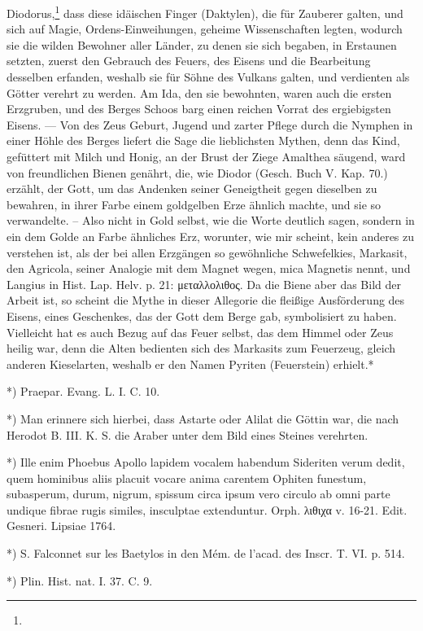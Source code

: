 \documentclass[a4paper, 11pt, oneside, polutonikogreek, german]{article}
\begin{document}
Diodorus,\footnote{} dass diese idäischen Finger (Daktylen), die für Zauberer galten, und sich auf Magie, Ordens-Einweihungen, geheime Wissenschaften legten, wodurch sie die wilden Bewohner aller Länder, zu denen sie sich begaben, in Erstaunen setzten, zuerst den Gebrauch des Feuers, des Eisens und die Bearbeitung desselben erfanden, weshalb sie für Söhne des Vulkans galten, und verdienten als Götter verehrt zu werden. Am Ida, den sie bewohnten, waren auch die ersten Erzgruben, und des Berges Schoos barg einen reichen Vorrat des ergiebigsten Eisens. --- Von des Zeus Geburt, Jugend und zarter Pflege durch die Nymphen in einer Höhle des Berges liefert die Sage die lieblichsten Mythen, denn das Kind, gefüttert mit Milch und Honig, an der Brust der Ziege Amalthea säugend, ward von freundlichen Bienen genährt, die, wie Diodor (Gesch. Buch V. Kap. 70.) erzählt, der Gott, um das Andenken seiner Geneigtheit gegen dieselben zu bewahren, in ihrer Farbe einem goldgelben Erze ähnlich machte, und sie so verwandelte. -- Also nicht in Gold selbst, wie die Worte deutlich sagen, sondern in ein dem Golde an Farbe ähnliches Erz, worunter, wie mir scheint, kein anderes zu verstehen ist, als der bei allen Erzgängen so gewöhnliche Schwefelkies, Markasit, den Agricola, seiner Analogie mit dem Magnet wegen, mica Magnetis nennt, und Langius in Hist. Lap. Helv. p. 21: μεταλλολιθος. Da die Biene aber das Bild der Arbeit ist, so scheint die Mythe in dieser Allegorie die fleißige Ausförderung des Eisens, eines Geschenkes, das der Gott dem Berge gab, symbolisiert zu haben. Vielleicht hat es auch Bezug auf das Feuer selbst, das dem Himmel oder Zeus heilig war, denn die Alten bedienten sich des Markasits zum Feuerzeug, gleich anderen Kieselarten, weshalb er den Namen Pyriten (Feuerstein) erhielt.*

*) Praepar. Evang. L. I. C. 10.

*) Man erinnere sich hierbei, dass Astarte oder Alilat die Göttin war, die nach Herodot B. III. K. S. die Araber unter dem Bild eines Steines verehrten.

*) Ille enim Phoebus Apollo lapidem vocalem habendum Sideriten verum dedit, quem hominibus aliis placuit vocare anima carentem Ophiten funestum, subasperum, durum, nigrum, spissum circa ipsum vero circulo ab omni parte undique fibrae rugis similes, insculptae extenduntur.
Orph. λιθιχα v. 16-21.
Edit. Gesneri. Lipsiae 1764.

*) S. Falconnet sur les Baetylos in den Mém. de l'acad. des Inscr. T. VI. p. 514.

*) Plin. Hist. nat. I. 37. C. 9.
\end{document}
